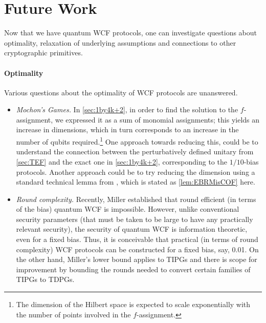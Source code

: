 \documentclass{article}
\begin{document}
%
%
%
\section{Future Work \label{sec:conclusions}}

%
%
%
%
%
%
%
%
%
%
%
%
%
%
%
%
%
%

%
%
%
%
%
%

%
Now that we have quantum WCF protocols, one can investigate questions about optimality, relaxation of underlying assumptions and connections to other cryptographic primitives.

\paragraph{Optimality} Various questions about the optimality of WCF protocols are unanswered.
\begin{itemize}
  \item \emph{Mochon's Games.} In \cref{sec:1by4k+2},  in order to find the solution to the $f$-assignment, we
        expressed it as a sum of monomial assignments; this yields an increase
        in dimensions, which in turn corresponds to an increase in the number
        of qubits required.\footnote{The dimension of the Hilbert space is expected to scale exponentially with the
          number of points involved in the $f$-assignment.}  One approach
        towards reducing this, could be to understand the connection between
        the perturbatively defined unitary from \cref{sec:TEF} and
        the exact one in \cref{sec:1by4k+2}, corresponding to the $1/10$-bias
        protocols. Another approach could be to try reducing the dimension
        using a standard technical lemma from \cite{Mochon07}, which is stated
        as \cref{lem:EBRMisCOF} here.
  \item \emph{Round complexity.} Recently, Miller \cite{Miller2019} established that round efficient (in terms of the bias) quantum WCF is impossible. However, unlike conventional security parameters (that must be taken to be large to have any practically relevant security), the security of quantum WCF is information theoretic, even for a fixed bias. Thus, it is conceivable that practical (in terms of round complexity) WCF protocols can be constructed for a fixed bias, say, 0.01. On the other hand, Miller's lower bound applies to TIPGs and there is scope for improvement by bounding the rounds needed to convert certain families of TIPGs to TDPGs.

\end{itemize}
\end{document}
